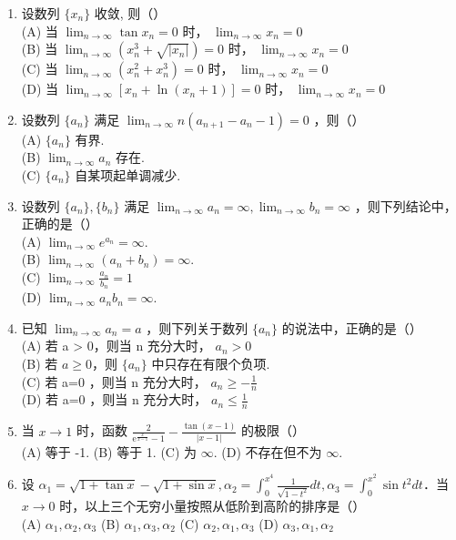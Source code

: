 \documentclass[12pt, a4paper]{ctexart}
\begin{document}
\begin{enumerate}
    \item 设数列 $ \{x_{n}\} $ 收敛, 则（）\\
    (A) 当 $ \lim_{n\to\infty}\tan x_n=0 $ 时， $ \lim_{n\to\infty}x_n=0 $\\
    (B) 当 $ \lim_{n\to\infty}\left(x_{n}^{3}+\sqrt{\left|x_{n}\right|}\right)=0 $ 时， $ \lim_{n\to\infty}x_{n}=0 $\\
    (C) 当 $ \lim_{n\to\infty}\left(x_{n}^{2}+x_{n}^{3}\right)=0 $ 时， $ \lim_{n\to\infty}x_{n}=0 $\\
    (D) 当 $ \lim_{n\to\infty}\left[x_{n}+\ln(x_{n}+1)\right]=0 $ 时， $ \lim_{n\to\infty}x_{n}=0 $

    \item 设数列 $ \{a_{n}\} $ 满足 $ \lim_{n\to\infty}n(a_{n+1}-a_{n}-1)=0 $ ，则（）\\
    (A) $ \{a_{n}\} $ 有界.\\
    (B) $ \lim_{n\to\infty}a_n $ 存在.\\
    (C) $ \{a_{n}\} $ 自某项起单调减少.

    \item 设数列 $ \{a_{n}\}, \{b_{n}\} $ 满足 $ \lim_{n\to\infty}a_{n}=\infty,\lim_{n\to\infty}b_{n}=\infty $ ，则下列结论中，正确的是（）\\
    (A) $ \lim_{n\to\infty}e^{a_n}=\infty $.\\
    (B) $ \lim_{n\to\infty}\left(a_{n}+b_{n}\right)=\infty $.\\
    (C) $ \lim_{n\to\infty}\frac{a_n}{b_n}=1 $\\
    (D) $ \lim_{n\to\infty}a_n b_n=\infty $.

    \item 已知 $ \lim_{n\to\infty}a_n=a $ ，则下列关于数列 $ \{a_n\} $ 的说法中，正确的是（）\\
    (A) 若 a > 0，则当 n 充分大时， $ a_{n} > 0 $\\
    (B) 若 $ a \geq 0 $，则 $ \{a_{n}\} $ 中只存在有限个负项.\\
    (C) 若 a=0 ，则当 n 充分大时， $ a_{n}\geq-\frac{1}{n} $\\
    (D) 若 a=0 ，则当 n 充分大时， $ a_{n}\leq\frac{1}{n} $

    \item 当 $ x \to 1 $ 时，函数 $ \frac{2}{\mathrm{e}^{\frac{x}{x-1}} - 1} - \frac{\tan(x-1)}{|x-1|} $ 的极限（）\\
    (A) 等于 -1. \quad (B) 等于 1. \quad (C) 为 $ \infty $. \quad (D) 不存在但不为 $ \infty $.

    \item 设 $ \alpha_{1}=\sqrt{1+\tan x}-\sqrt{1+\sin x},\alpha_{2}=\int_{0}^{x^{4}}\frac{1}{\sqrt{1-t^{2}}}dt,\alpha_{3}=\int_{0}^{x^{2}}\sin t^{2}dt $．当 $ x\to0 $ 时，以上三个无穷小量按照从低阶到高阶的排序是（）\\
    (A) $ \alpha_{1},\alpha_{2},\alpha_{3} $ \quad (B) $ \alpha_{1},\alpha_{3},\alpha_{2} $ \quad (C) $ \alpha_{2},\alpha_{1},\alpha_{3} $ \quad (D) $ \alpha_{3},\alpha_{1},\alpha_{2} $


\end{enumerate}
\end{document}
